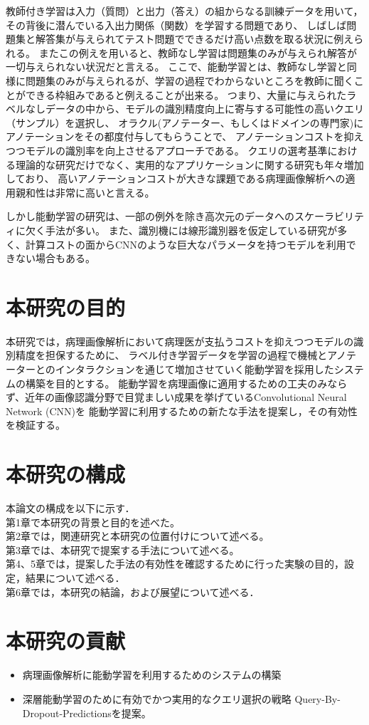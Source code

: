 教師付き学習は入力（質問）と出力（答え）の組からなる訓練データを用いて， その背後に潜んでいる入出力関係（関数）を学習する問題であり、
しばしば問題集と解答集が与えられてテスト問題でできるだけ高い点数を取る状況に例えられる。
またこの例えを用いると、教師なし学習は問題集のみが与えられ解答が一切与えられない状況だと言える。
ここで、能動学習とは、教師なし学習と同様に問題集のみが与えられるが、学習の過程でわからないところを教師に聞くことができる枠組みであると例えることが出来る。
つまり、大量に与えられたラベルなしデータの中から、モデルの識別精度向上に寄与する可能性の高いクエリ（サンプル）を選択し、
オラクル(アノテーター、もしくはドメインの専門家)にアノテーションをその都度付与してもらうことで、
アノテーションコストを抑えつつモデルの識別率を向上させるアプローチである。
クエリの選考基準における理論的な研究だけでなく、実用的なアプリケーションに関する研究も年々増加しており、
高いアノテーションコストが大きな課題である病理画像解析への適用親和性は非常に高いと言える。

しかし能動学習の研究は、一部の例外を除き高次元のデータへのスケーラビリティに欠く手法が多い。
また、識別機には線形識別器を仮定している研究が多く、計算コストの面からCNNのような巨大なパラメータを持つモデルを利用できない場合もある。

\section{本研究の目的}
本研究では，病理画像解析において病理医が支払うコストを抑えつつモデルの識別精度を担保するために、
ラベル付き学習データを学習の過程で機械とアノテーターとのインタラクションを通じて増加させていく能動学習を採用したシステムの構築を目的とする。
能動学習を病理画像に適用するための工夫のみならず、近年の画像認識分野で目覚ましい成果を挙げているConvolutional Neural Network (CNN)を
能動学習に利用するための新たな手法を提案し，その有効性を検証する。


\section{本研究の構成}
本論文の構成を以下に示す．\\
第1章で本研究の背景と目的を述べた。 \\
第2章では，関連研究と本研究の位置付けについて述べる。\\
第3章では、本研究で提案する手法について述べる。\\
第4、5章では，提案した手法の有効性を確認するために行った実験の目的，設定，結果について述べる．\\
第6章では，本研究の結論，および展望について述べる．

\section{本研究の貢献}
\begin{itemize}
    \item 病理画像解析に能動学習を利用するためのシステムの構築
    \item 深層能動学習のために有効でかつ実用的なクエリ選択の戦略 Query-By-Dropout-Predictionsを提案。
\end{itemize}
